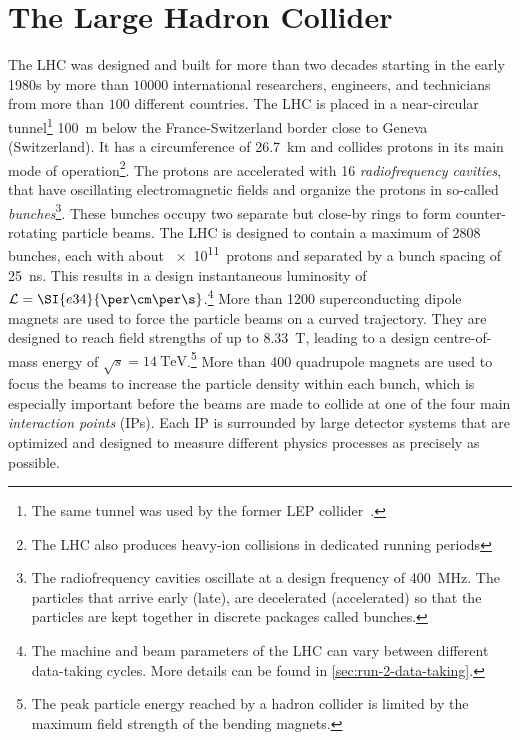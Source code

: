 \section{The Large Hadron Collider}
The LHC was designed and built for more than two decades starting in the early 1980s by more than $10000$ international researchers, engineers, and technicians from more than $100$ different countries.
The LHC is placed in a near-circular tunnel\footnote{The same tunnel was used by the former LEP collider~\cite{LEPDesignReport}.} \SI{100}{\m} below the France-Switzerland border close to Geneva (Switzerland). It has a circumference of \SI{26.7}{\km} and collides protons in its main mode of operation\footnote{The LHC also produces heavy-ion collisions in dedicated running periods}. 
The protons are accelerated with 16 \emph{radiofrequency cavities}, that have oscillating electromagnetic fields and organize the protons in so-called \emph{bunches}\footnote{The radiofrequency cavities oscillate at a design frequency of \SI{400}{\mega\hertz}. The particles that arrive early (late), are decelerated (accelerated) so that the particles are kept together in discrete packages called bunches.}.
These bunches occupy two separate but close-by rings to form counter-rotating particle beams.
The LHC is designed to contain a maximum of 2808 bunches, each with about \SI{e11}{protons} and separated by a bunch spacing of \SI{25}{\ns}. This results in a design instantaneous luminosity of $\instLumi = \SI{e34}{\per\cm\per\s}$.\footnote{The machine and beam parameters of the LHC can vary between different data-taking cycles. More details can be found in \cref{sec:run-2-data-taking}.}
More than 1200 superconducting dipole magnets are used to force the particle beams on a curved trajectory.
They are designed to reach field strengths of up to \SI{8.33}{\tesla}, leading to a design centre-of-mass energy of $\sqrt{s} = \SI{14}{\TeV}$.\footnote{The peak particle energy reached by a hadron collider is limited by the maximum field strength of the bending magnets.} More than 400 quadrupole magnets are used to focus the beams to increase the particle density within each bunch, which is especially important before the beams are made to collide at one of the four main \emph{interaction points} (IPs). Each IP is surrounded by large detector systems that are optimized and designed to measure different physics processes as precisely as possible.
